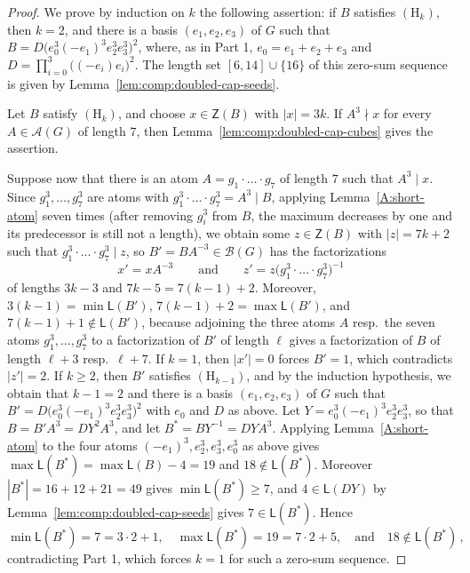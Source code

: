 \documentclass[a4paper, 10pt]{amsart}
\theoremstyle{plain}
\theoremstyle{definition}
\theoremstyle{definition}
\numberwithin{equation}{section}
\begin{document}
\begin{proof}
We prove by induction on $k$ the following assertion: if $B$ satisfies
$(\mathrm H_k)$, then $k=2$, and there is a basis $(e_1,e_2,e_3)$ of $G$
such that $B = D\bigl(e_0^3(-e_1)^3e_2^3e_3^3\bigr)^2$, where, as in Part 1, $e_0=e_1+e_2+e_3$ and $D=\prod_{i=0}^{3}\bigl((-e_i)e_i\bigr)^2$.
The length set
$[6,14]\cup\{16\}$ of this zero-sum sequence is given by
Lemma~\ref{lem:comp:doubled-cap-seeds}.

Let $B$ satisfy $(\mathrm H_k)$, and choose $x\in \mathsf Z (B)$ with
$|x| = 3k$.  If $A^3\nmid x$ for every $A\in \mathcal A(G)$ of length $7$, then
Lemma~\ref{lem:comp:doubled-cap-cubes} gives the assertion.

Suppose now that there is an atom
$A = g_1 \cdot \ldots \cdot g_7$ of length $7$ such that $A^3 \mid x$.  Since $g_1^3, \ldots, g_7^3$ are atoms with $g_1^3 \cdot \ldots \cdot g_7^3 = A^3 \mid B$,
applying Lemma~\ref{A:short-atom} seven times (after removing  $g_i^3$
from $B$, the maximum decreases by one and its predecessor is still not a
length), we obtain some $z\in \mathsf Z (B)$ with $|z| = 7k+2$ such that $g_1^3 \cdot \ldots \cdot g_7^3 \mid z$,
so $B' = BA^{-3} \in \mathcal B (G)$ has the factorizations
\[
 x' = x A^{-3}
 \qquad \text{and} \qquad
 z' = z \bigl(g_1^3 \cdot \ldots \cdot g_7^3\bigr)^{-1}
\]
of lengths $3k-3$ and $7k-5 = 7(k-1)+2$.  Moreover, $3(k-1)=\min \mathsf L(B')$, $7(k-1)+2=\max\mathsf L(B')$, and $7(k-1)+1\not\in \mathsf L(B')$, because
adjoining the three atoms $A$ resp.\ the seven atoms $g_1^3, \ldots, g_7^3$ to a factorization of $B'$ of length $\ell$
gives a factorization of $B$ of length $\ell+3$ resp.\ $\ell+7$.
If $k = 1$, then $|x'| = 0$ forces $B' = 1$, which
contradicts $|z'| = 2$.  If $k \ge 2$, then $B'$ satisfies
$(\mathrm H_{k-1})$, and by the induction hypothesis, we obtain that $k-1 = 2$ and there is
a basis $(e_1,e_2,e_3)$ of $G$ such that
$B' = D\bigl(e_0^3(-e_1)^3e_2^3e_3^3\bigr)^2$ with $e_0$ and $D$ as above. 
 Let $Y = e_0^3(-e_1)^3e_2^3e_3^3$, so that $B = B'A^3 = DY^2A^3$, and let
$B^*=BY^{-1} = DYA^3$.  Applying Lemma~\ref{A:short-atom} to the four atoms $(-e_1)^3,e_2^3,e_3^3,e_0^3$ as above gives $\max\mathsf L(B^*) = \max\mathsf L(B) - 4 = 19$ and
$18 \notin \mathsf L(B^*)$.  Moreover $|B^*| = 16+12+21 = 49$ gives
$\min\mathsf L(B^*) \ge 7$, and $4 \in \mathsf L(DY)$ by
Lemma~\ref{lem:comp:doubled-cap-seeds} gives $7 \in \mathsf L(B^*)$.  Hence
\[
\min \mathsf L(B^*)=7=3\cdot 2+1, \quad \max\mathsf L(B^*)=19=7\cdot 2+5, \quad\text{and}\quad 18\notin\mathsf L(B^*)\,,
\]
contradicting Part 1, which forces $k=1$ for such a zero-sum sequence.
\end{proof}
\end{document}
